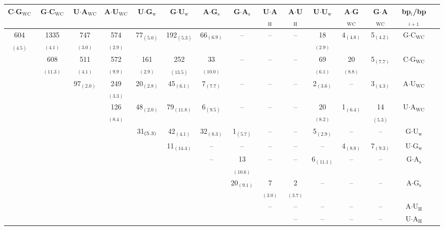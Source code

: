 \begin{table}
\begin{center}
\begin{tabular}{|c|c|c|c|c|c|c|c|c|c|c|c|c|c|c|}
\hline
C$\cdot$G$_{\text{WC}}$ & G$\cdot$C$_{\text{WC}}$ & U$\cdot$A$_{\text{WC}}$ &
A$\cdot$U$_{\text{WC}}$ & U$\cdot$G$_{\text{w}}$ &
G$\cdot$U$_{\text{w}}$ & A$\cdot$G$_{\text{s}}$ &
G$\cdot$A$_{\text{s}}$ & U$\cdot$A$_{\text{H}}$ &
A$\cdot$U$_{\text{H}}$ & U$\cdot$U$_{\text{w}}$ &
A$\cdot$G$_{\text{WC}}$ & G$\cdot$A$_{\text{WC}}$ & bp$_{i}$/bp$_{i+1}$\\ 
\hline  
604$_{(\text{4.5})}$ & 1335$_{(\text{4.1})}$ & 747$_{(\text{3.0})}$ & 574$_{(\text{2.9})}$ & 77$_{(\text{5.0})}$ & 192$_{(\text{5.3})}$ & 66$_{(\text{6.9})}$ & -- & -- & -- & 18$_{(\text{2.9})}$ & 4$_{(\text{4.8})}$ & 5$_{(\text{4.2})}$ & G$\cdot$C$_{\text{WC}}$\\
 & 608$_{(\text{11.3})}$ & 511$_{(\text{4.1})}$ & 572$_{(\text{9.9})}$ & 161$_{(\text{2.9})}$ & 252$_{(\text{13.5})}$ & 33$_{(\text{10.0})}$ & -- & -- & -- & 69$_{(\text{6.1})}$ & 20$_{(\text{8.8})}$ & 5$_{(\text{7.7})}$ & C$\cdot$G$_{\text{WC}}$\\
 &  & 97$_{(\text{2.0})}$ & 249$_{(\text{3.3})}$ & 20$_{(\text{2.8})}$ & 45$_{(\text{6.1})}$ & 7$_{(\text{7.7})}$ & -- & -- & -- & 2$_{(\text{3.6})}$ & -- & 3$_{(\text{4.3})}$ & A$\cdot$U$_{\text{WC}}$\\
 &  &  & 126$_{(\text{8.4})}$ & 48$_{(\text{2.0})}$ & 79$_{(\text{11.8})}$ & 6$_{(\text{9.5})}$ & -- & -- & -- & 20$_{(\text{8.2})}$ & 1$_{(\text{6.4})}$ & 14$_{(\text{5.3})}$ & U$\cdot$A$_{\text{WC}}$\\
 &  &  &  & 31$_{(\text5.3{})}$ & 42$_{(\text{4.1})}$ & 32$_{(\text{8.3})}$ & 1$_{(\text{5.7})}$ & -- & -- & 5$_{(\text{2.9})}$ & -- & -- & G$\cdot$U$_{\text{w}}$\\
 &  &  &  &  & 11$_{(\text{14.4})}$ & -- & -- & -- & -- & -- & 4$_{(\text{8.8})}$ & 7$_{(\text{9.3})}$ & U$\cdot$G$_{\text{w}}$\\
 &  &  &  &  &  & -- & 13$_{(\text{10.6})}$ & -- & -- & 6$_{(\text{11.1})}$ & -- & -- & G$\cdot$A$_{\text{s}}$\\ 
 &  &  &  &  &  &  & 20$_{(\text{9.1})}$ & 7$_{(\text{3.0})}$ & 2$_{(\text{3.7})}$ & -- & -- & -- & A$\cdot$G$_{\text{s}}$\\
 &  &  &  &  &  &  &  & -- & -- & -- & -- & -- & A$\cdot$U$_{\text{H}}$\\
 &  &  &  &  &  &  &  &  & -- & -- & -- & -- & U$\cdot$A$_{\text{H}}$\\

\end{tabular}
\end{center}
\end{table}
